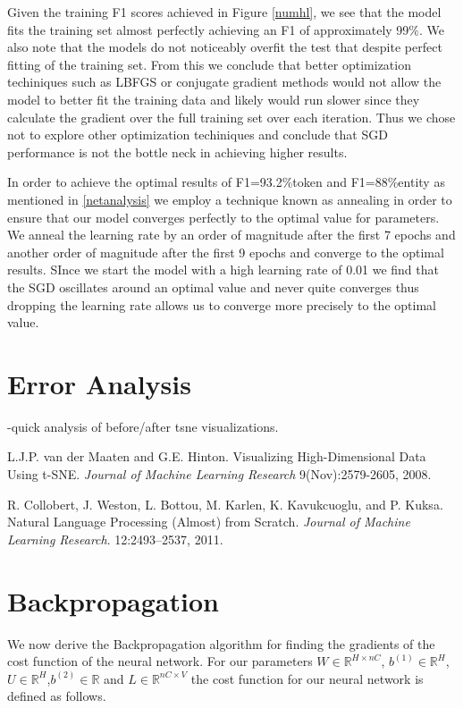 \documentclass{article}
\begin{document}
Given the training F1 scores achieved in Figure \ref{numhl}, we see that the model fits the training set almost perfectly achieving an F1 of approximately 99\%.  We also note that the models do not noticeably overfit the test that despite perfect fitting of the training set.  From this we conclude that better optimization techiniques such as LBFGS or conjugate gradient methods would not allow the model to better fit the training data and likely would run slower since they calculate the gradient over the full training set over each iteration.  Thus we chose not to explore other optimization techiniques and conclude that SGD performance is not the bottle neck in achieving higher results.

In order to achieve the optimal results of F1=93.2\%token and F1=88\%entity as mentioned in \ref{netanalysis} we employ a technique known as annealing in order to ensure that our model converges perfectly to the optimal value for parameters.  We anneal the learning rate by an order of magnitude after the first 7 epochs and another order of magnitude after the first 9 epochs and converge to the optimal results.  SInce we start the model with a high learning rate of 0.01 we find that the SGD oscillates around an optimal value and never quite converges thus dropping the learning rate allows us to converge more precisely to the optimal value.


\section{Error Analysis}
-quick analysis of before/after tsne visualizations.

\newpage

\begin{thebibliography}{9}

  L.J.P. van der Maaten and G.E. Hinton. Visualizing High-Dimensional Data Using t-SNE. 
  \emph{Journal of Machine Learning Research}
  9(Nov):2579-2605, 2008.

  R. Collobert, J. Weston, L. Bottou, M. Karlen, K. Kavukcuoglu, and P. Kuksa.
  Natural Language Processing (Almost) from Scratch.
  \emph{Journal of Machine Learning Research}.
  12:2493–2537, 2011.


\end{thebibliography}

\newpage
\appendix
\appendixpage

\section{Backpropagation}\label{backprop}
We now derive the Backpropagation algorithm for finding the gradients of the cost function of the neural network.  For our parameters \(W\in\mathbb{R}^{H \times nC}\), \( b^{(1)} \in\mathbb{R}^H\), \(U\in\mathbb{R}^H\),\( b^{(2)} \in\mathbb{R}\) and \(L\in\mathbb{R}^{nC \times V}\) the cost function for our neural network is defined as follows.
\end{document}
